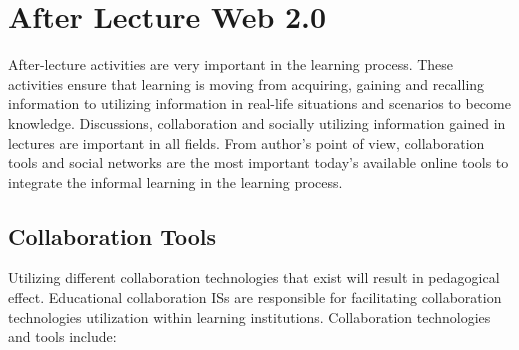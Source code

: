 \documentclass[12pt,a4paper,final,twoside,onecolumn,titlepage]{book}
\begin{document}
\section{After Lecture Web 2.0}
After-lecture activities are very important in the learning process. These activities ensure that learning is moving from acquiring, gaining and recalling information to utilizing information in real-life situations and scenarios to become knowledge. Discussions, collaboration and socially utilizing information gained in lectures are important in all fields. From author’s point of view, collaboration tools and social networks are the most important today’s available online tools to integrate the informal learning in the learning process.
\subsection{Collaboration Tools}
Utilizing different collaboration technologies that exist will result in pedagogical effect. Educational collaboration \gls{IS}s are responsible for facilitating collaboration technologies utilization within learning institutions. Collaboration technologies and tools include:
\end{document}
